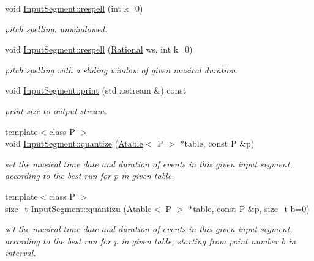 \begin{DoxyCompactItemize}
void \mbox{\hyperlink{group__segment_ga2d78677ab3ea44ae91034c4e312e778c}{Input\+Segment\+::respell}} (int k=0)
\begin{DoxyCompactList}\small\item\em pitch spelling. unwindowed. \end{DoxyCompactList}\item 
void \mbox{\hyperlink{group__segment_gac79787254008e05d9f54226d93dcb0cb}{Input\+Segment\+::respell}} (\mbox{\hyperlink{classRational}{Rational}} ws, int k=0)
\begin{DoxyCompactList}\small\item\em pitch spelling with a sliding window of given musical duration. \end{DoxyCompactList}\item 
\mbox{\label{group__segment_ga623c2367191018ecac046e7e11f14976}} 
void \mbox{\hyperlink{group__segment_ga623c2367191018ecac046e7e11f14976}{Input\+Segment\+::print}} (std\+::ostream \&) const
\begin{DoxyCompactList}\small\item\em print size to output stream. \end{DoxyCompactList}\item 
{\footnotesize template$<$class P $>$ }\\void \mbox{\hyperlink{group__segment_ga42c65e4989c84fbce42115d8e7813f8e}{Input\+Segment\+::quantize}} (\mbox{\hyperlink{classAtable}{Atable}}$<$ P $>$ $\ast$table, const P \&p)
\begin{DoxyCompactList}\small\item\em set the musical time date and duration of events in this given input segment, according to the best run for p in given table. \end{DoxyCompactList}\item 
{\footnotesize template$<$class P $>$ }\\size\+\_\+t \mbox{\hyperlink{group__segment_gab4c42d088ce3d170b7899712789ab464}{Input\+Segment\+::quantizu}} (\mbox{\hyperlink{classAtable}{Atable}}$<$ P $>$ $\ast$table, const P \&p, size\+\_\+t b=0)
\begin{DoxyCompactList}\small\item\em set the musical time date and duration of events in this given input segment, according to the best run for p in given table, starting from point number b in interval. \end{DoxyCompactList}\item 

\end{DoxyCompactItemize}
